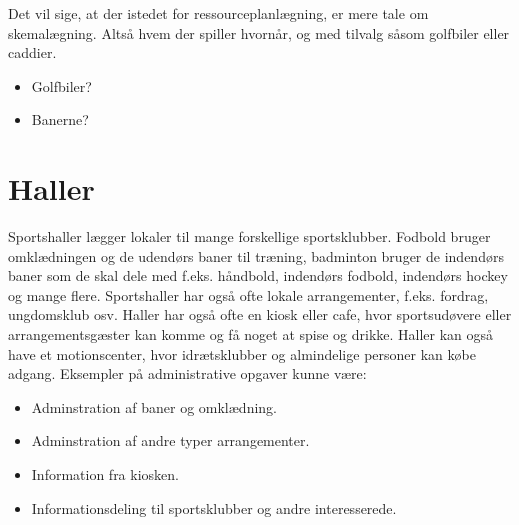 Det vil sige, at der istedet for ressourceplanlægning, er mere tale om skemalægning. Altså hvem der spiller hvornår, og med tilvalg såsom golfbiler eller caddier.
\begin{itemize}
\item Golfbiler?
\item Banerne?
\end{itemize}

\section{Haller}
Sportshaller lægger lokaler til mange forskellige sportsklubber. Fodbold bruger omklædningen og de udendørs baner til træning, badminton bruger de indendørs baner som de skal dele med f.eks. håndbold, indendørs fodbold, indendørs hockey og mange flere. Sportshaller har også ofte lokale arrangementer, f.eks. fordrag, ungdomsklub osv. 
Haller har også ofte en kiosk eller cafe, hvor sportsudøvere eller arrangementsgæster kan komme og få noget at spise og drikke. 
Haller kan også have et motionscenter, hvor idrætsklubber og almindelige personer kan købe adgang. 
Eksempler på administrative opgaver kunne være:
\begin{itemize}
\item Adminstration af baner og omklædning.
\item Adminstration af andre typer arrangementer.
\item Information fra kiosken.
\item Informationsdeling til sportsklubber og andre interesserede.
\end{itemize}
